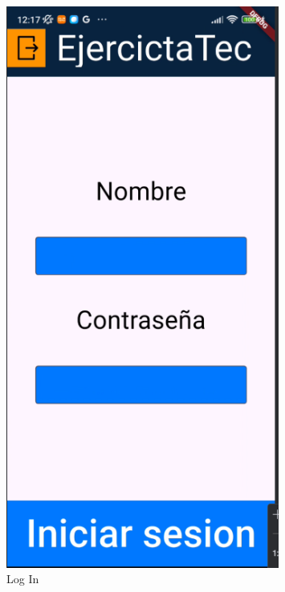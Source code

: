 \begin{figure}[H]
   \centering
    \includegraphics[width=0.8\textwidth]{pantallas/LogIn.png}
    \caption{Log In}
    \label{fig:LogIn}
\end{figure}

